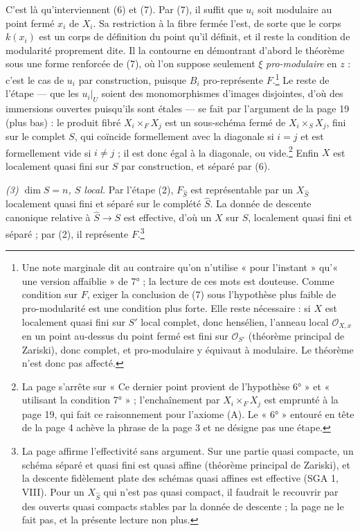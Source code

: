 \documentclass[11pt,a4paper]{article}
\begin{document}
C'est là qu'interviennent (6) et (7). Par (7), il suffit que $u_i$ soit
modulaire au point fermé $x_i$ de $X_i$. Sa restriction à la fibre fermée
l'est, de sorte que le corps $k(x_i)$ est un corps de définition du point
qu'il définit, et il reste la condition de modularité proprement dite. Il la
contourne en démontrant d'abord le théorème sous une forme renforcée de (7),
où l'on suppose seulement $\xi$ \emph{pro-modulaire} en $z$ : c'est le cas de
$u_i$ par construction, puisque $B_i$ pro-représente $F$.\footnote{Une note
marginale dit au contraire qu'on n'utilise « pour l'instant » qu'« une
version affaiblie » de 7° ; la lecture de ces mots est douteuse. Comme
condition sur $F$, exiger la conclusion de (7) sous l'hypothèse plus faible
de pro-modularité est une condition plus forte. Elle reste nécessaire : si $X$
est localement quasi fini sur $S'$ local complet, donc hensélien,
l'anneau local $\mathcal{O}_{X,x}$ en un point au-dessus du point fermé est
fini sur $\mathcal{O}_{S'}$ (théorème principal de Zariski), donc complet, et
pro-modulaire y équivaut à modulaire. Le théorème n'est donc pas affecté.} Le
reste de l'étape — que les $u_i|_U$ soient des monomorphismes d'images
disjointes, d'où des immersions ouvertes puisqu'ils sont étales — se fait par
l'argument de la page 19 (plus bas) : le produit fibré $X_i \times_F X_j$ est
un sous-schéma fermé de $X_i \times_S X_j$, fini sur le complet $S$, qui
coïncide formellement avec la diagonale si $i = j$ et est formellement vide si
$i \neq j$ ; il est donc égal à la diagonale, ou vide.\footnote{La page
s'arrête sur « Ce dernier point provient de l'hypothèse 6° » et « utilisant
la condition 7° » ; l'enchaînement par $X_i \times_F X_j$ est emprunté à la
page 19, qui fait ce raisonnement pour l'axiome (A). Le « 6° » entouré en tête
de la page 4 achève la phrase de la page 3 et ne désigne pas une étape.} Enfin
$X$ est localement quasi fini sur $S$ par construction, et séparé par (6).

\emph{(3) $\dim S = n$, $S$ local.} Par l'étape (2), $F_{\widehat{S}}$ est
représentable par un $X_{\widehat{S}}$ localement quasi fini et séparé sur
le complété $\widehat{S}$. La donnée de descente canonique relative à
$\widehat{S} \to S$ est effective, d'où un $X$ sur $S$, localement quasi fini
et séparé ; par (2), il représente $F$.\footnote{La page affirme l'effectivité
sans argument. Sur une partie quasi compacte, un schéma séparé et quasi fini
est quasi affine (théorème principal de Zariski), et la descente fidèlement
plate des schémas quasi affines est effective (SGA 1, VIII). Pour un
$X_{\widehat{S}}$ qui n'est pas quasi compact, il faudrait le recouvrir par
des ouverts quasi compacts stables par la donnée de descente ; la page ne le
fait pas, et la présente lecture non plus.}
\end{document}
